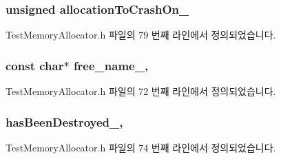 \subsubsection[{\texorpdfstring{allocation\+To\+Crash\+On\+\_\+}{allocationToCrashOn_}}]{\setlength{\rightskip}{0pt plus 5cm}unsigned allocation\+To\+Crash\+On\+\_\+\hspace{0.3cm}{\ttfamily [private]}}\hypertarget{class_crash_on_allocation_allocator_af8165a9bc21b924230ab532b1f65d90f}{}\label{class_crash_on_allocation_allocator_af8165a9bc21b924230ab532b1f65d90f}


Test\+Memory\+Allocator.\+h 파일의 79 번째 라인에서 정의되었습니다.

\subsubsection[{\texorpdfstring{free\+\_\+name\+\_\+}{free_name_}}]{\setlength{\rightskip}{0pt plus 5cm}const char$\ast$ free\+\_\+name\+\_\+\hspace{0.3cm}{\ttfamily [protected]}, {\ttfamily [inherited]}}\hypertarget{class_test_memory_allocator_a4f7ece205625129df190e624cccf9286}{}\label{class_test_memory_allocator_a4f7ece205625129df190e624cccf9286}


Test\+Memory\+Allocator.\+h 파일의 72 번째 라인에서 정의되었습니다.

\subsubsection[{\texorpdfstring{has\+Been\+Destroyed\+\_\+}{hasBeenDestroyed_}}]{ has\+Been\+Destroyed\+\_\+\hspace{0.3cm}{\ttfamily [protected]}, {\ttfamily [inherited]}}\hypertarget{class_test_memory_allocator_a971604f223534e64d5024d63396b397a}{}\label{class_test_memory_allocator_a971604f223534e64d5024d63396b397a}


Test\+Memory\+Allocator.\+h 파일의 74 번째 라인에서 정의되었습니다.

